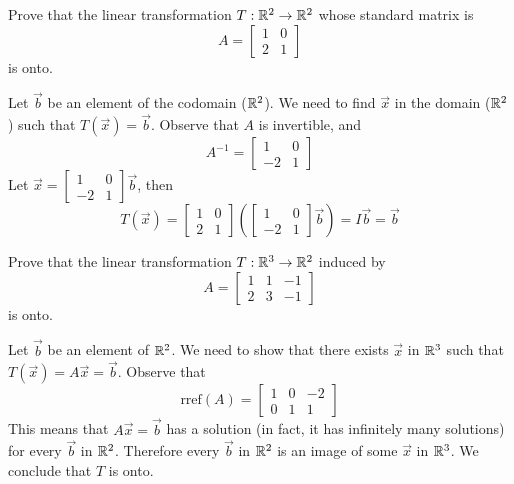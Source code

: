 \documentclass{ximera}
\begin{document}
\begin{example}\label{ex:onto1} Prove that the linear transformation $T:\mathbb{R}^2\rightarrow \mathbb{R}^2$ whose standard matrix is $$A=\begin{bmatrix}1&0\\2&1\end{bmatrix}$$ is onto.
\begin{explanation} Let $\vec{b}$ be an element of the codomain ($\mathbb{R}^2$).  We need to find $\vec{x}$ in the domain ($\mathbb{R}^2$) such that $T(\vec{x})=\vec{b}$. 
Observe that $A$ is invertible, and $$A^{-1}=\begin{bmatrix}1&0\\-2&1\end{bmatrix}$$
 Let $\vec{x}=\begin{bmatrix}1&0\\-2&1\end{bmatrix}\vec{b}$, then 
 $$T(\vec{x})=\begin{bmatrix}1&0\\2&1\end{bmatrix}\left(\begin{bmatrix}1&0\\-2&1\end{bmatrix}\vec{b}\right)=I\vec{b}=\vec{b}$$
\end{explanation}
\end{example}

\begin{example}\label{ex:onto2} Prove that the linear transformation $T:\mathbb{R}^3\rightarrow \mathbb{R}^2$ induced by $$A=\begin{bmatrix}1&1&-1\\2&3&-1\end{bmatrix}$$ is onto.

\begin{explanation}

Let $\vec{b}$ be an element of $\mathbb{R}^2$.  We need to show that there exists $\vec{x}$ in $\mathbb{R}^3$ such that $T(\vec{x})=A\vec{x}=\vec{b}$. 
Observe that
 $$\mbox{rref}(A)=\begin{bmatrix}1 & 0 & -2\\0 & 1 & 1\end{bmatrix}$$
 This means that $A\vec{x}=\vec{b}$ has a solution (in fact, it has infinitely many solutions) for every $\vec{b}$ in $\mathbb{R}^2$.  Therefore every $\vec{b}$ in $\mathbb{R}^2$ is an image of some $\vec{x}$ in $\mathbb{R}^3$. We conclude that $T$ is onto. 
\end{explanation}
\end{example}
\end{document}
